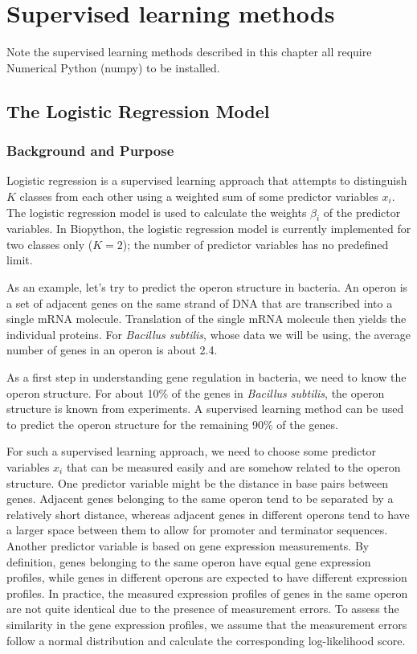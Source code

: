 \documentclass{report}
\begin{document}
\chapter{Supervised learning methods}

Note the supervised learning methods described in this chapter all require Numerical Python (numpy) to be installed.

\section{The Logistic Regression Model}
\label{sec:LogisticRegression}

\subsection{Background and Purpose}

Logistic regression is a supervised learning approach that attempts to distinguish $K$ classes from each other using a weighted sum of some predictor variables $x_i$. The logistic regression model is used to calculate the weights $\beta_i$ of the predictor variables. In Biopython, the logistic regression model is currently implemented for two classes only ($K = 2$); the number of predictor variables has no predefined limit.

As an example, let's try to predict the operon structure in bacteria. An operon is a set of adjacent genes on the same strand of DNA that  are transcribed into a single mRNA molecule. Translation of the single mRNA molecule then yields the individual proteins. For {\it Bacillus subtilis}, whose data we will be using, the average number of genes in an operon is about 2.4.

As a first step in understanding gene regulation in bacteria, we need to know the operon structure. For about 10\% of the genes in {\it Bacillus subtilis}, the operon structure is known from experiments. A supervised learning method can be used to predict the operon structure for the remaining 90\% of the genes.

For such a supervised learning approach, we need to choose some predictor variables $x_i$ that can be measured easily and are somehow related to the operon structure. One predictor variable might be the distance in base pairs between genes. Adjacent genes belonging to the same operon tend to be separated by a relatively short distance, whereas adjacent genes in different operons tend to have a larger space between them to allow for promoter and terminator sequences. Another predictor variable is based on gene expression measurements. By definition, genes belonging to the same operon have equal gene expression profiles, while genes in different operons are expected to have different expression profiles. In practice, the measured expression profiles of genes in the same operon are not quite identical due to the presence of measurement errors. To assess the similarity in the gene expression profiles, we assume that the measurement errors follow a normal distribution and calculate the corresponding log-likelihood score.
\end{document}
